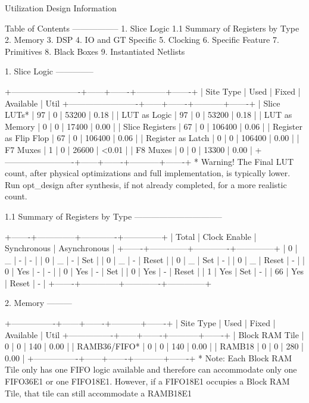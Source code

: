 \documentclass{article}
\begin{document}
Utilization Design Information

Table of Contents
-----------------
1. Slice Logic
1.1 Summary of Registers by Type
2. Memory
3. DSP
4. IO and GT Specific
5. Clocking
6. Specific Feature
7. Primitives
8. Black Boxes
9. Instantiated Netlists

1. Slice Logic
--------------

+-------------------------+------+-------+-----------+-------+
|        Site Type        | Used | Fixed | Available | Util%
+-------------------------+------+-------+-----------+-------+
| Slice LUTs*             |   97 |     0 |     53200 |  0.18 |
|   LUT as Logic          |   97 |     0 |     53200 |  0.18 |
|   LUT as Memory         |    0 |     0 |     17400 |  0.00 |
| Slice Registers         |   67 |     0 |    106400 |  0.06 |
|   Register as Flip Flop |   67 |     0 |    106400 |  0.06 |
|   Register as Latch     |    0 |     0 |    106400 |  0.00 |
| F7 Muxes                |    1 |     0 |     26600 | <0.01 |
| F8 Muxes                |    0 |     0 |     13300 |  0.00 |
+-------------------------+------+-------+-----------+-------+
* Warning! The Final LUT count, after physical optimizations and full implementation, is typically lower. Run opt_design after synthesis, if not already completed, for a more realistic count.


1.1 Summary of Registers by Type
--------------------------------

+-------+--------------+-------------+--------------+
| Total | Clock Enable | Synchronous | Asynchronous |
+-------+--------------+-------------+--------------+
| 0     |            _ |           - |            - |
| 0     |            _ |           - |          Set |
| 0     |            _ |           - |        Reset |
| 0     |            _ |         Set |            - |
| 0     |            _ |       Reset |            - |
| 0     |          Yes |           - |            - |
| 0     |          Yes |           - |          Set |
| 0     |          Yes |           - |        Reset |
| 1     |          Yes |         Set |            - |
| 66    |          Yes |       Reset |            - |
+-------+--------------+-------------+--------------+


2. Memory
---------

+----------------+------+-------+-----------+-------+
|    Site Type   | Used | Fixed | Available | Util%
+----------------+------+-------+-----------+-------+
| Block RAM Tile |    0 |     0 |       140 |  0.00 |
|   RAMB36/FIFO* |    0 |     0 |       140 |  0.00 |
|   RAMB18       |    0 |     0 |       280 |  0.00 |
+----------------+------+-------+-----------+-------+
* Note: Each Block RAM Tile only has one FIFO logic available and therefore can accommodate only one FIFO36E1 or one FIFO18E1. However, if a FIFO18E1 occupies a Block RAM Tile, that tile can still accommodate a RAMB18E1
\end{document}
